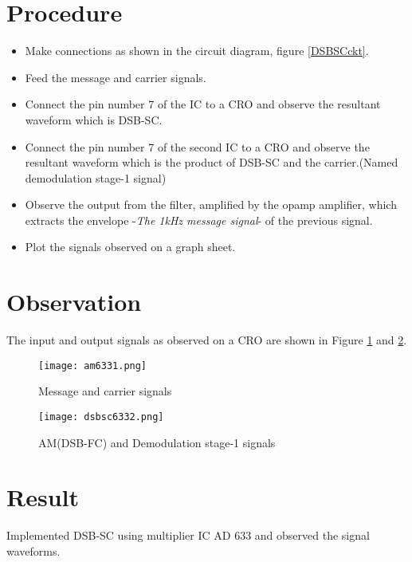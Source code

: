 \section*{Procedure}
\begin{itemize}
\item
Make connections as shown in the circuit diagram, figure \ref{DSBSCckt}.
\item
Feed the message and carrier signals.
\item
Connect the pin number 7 of the IC to a CRO and observe the resultant waveform which is DSB-SC.
\item
Connect the pin number 7 of the second IC to a CRO and observe the resultant waveform which is the product of DSB-SC and the carrier.(Named demodulation stage-1 signal)
\item
Observe the output from the filter, amplified by the opamp amplifier, which extracts the envelope -\emph{The 1kHz message signal}- of the previous signal.
\item
Plot the signals observed on a graph sheet.
\end{itemize}
\section*{Observation}



The input and output signals as observed on a CRO are shown in Figure \ref{msg633plot1} and \ref{dsbsc633plot2}.
\begin{figure}[ht]
\texttt{[image: am6331.png]}
\caption{Message and carrier signals}
\label{msg633plot1}
\end{figure}

\begin{figure}[ht]
\texttt{[image: dsbsc6332.png]}
\caption{AM(DSB-FC) and Demodulation stage-1 signals}
\label{dsbsc633plot2}
\end{figure}

\section*{Result}
Implemented DSB-SC using multiplier IC AD 633 and observed the signal waveforms.